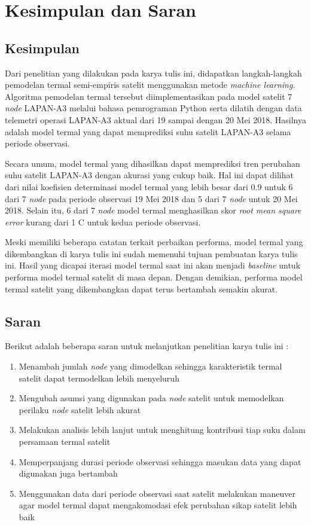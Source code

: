 \chapter{Kesimpulan dan Saran}

\section{Kesimpulan}

Dari penelitian yang dilakukan pada karya tulis ini, didapatkan langkah-langkah
pemodelan termal semi-empiris satelit menggunakan metode \textit{machine learning}.
Algoritma pemodelan termal tersebut diimplementasikan pada model satelit 7 \textit{node}
LAPAN-A3 melalui bahasa pemrograman Python serta dilatih dengan data telemetri
operasi LAPAN-A3 aktual dari 19 sampai dengan 20 Mei 2018. Hasilnya adalah model
termal yang dapat memprediksi suhu satelit LAPAN-A3 selama periode
observasi.

Secara umum, model termal yang dihasilkan dapat memprediksi tren perubahan suhu satelit LAPAN-A3 dengan akurasi yang cukup baik. Hal ini dapat
dilihat dari nilai koefisien determinasi model termal yang lebih besar dari 0.9
untuk 6 dari 7 \textit{node} pada periode observasi 19 Mei 2018 dan 5 dari 7 \textit{node} untuk
20 Mei 2018. Selain itu, 6 dari 7 \textit{node} model termal menghasilkan skor
\textit{root mean square error} kurang dari 1 \degree C untuk kedua periode observasi. 

Meski memiliki beberapa catatan terkait perbaikan performa, model termal yang
dikembangkan di karya tulis ini sudah memenuhi tujuan pembuatan karya tulis
ini. Hasil yang dicapai iterasi model termal saat ini akan menjadi
\textit{baseline} untuk performa model termal satelit di masa depan. Dengan
demikian, performa model termal satelit yang dikembangkan dapat terus bertambah
semakin akurat.

\section{Saran}

Berikut adalah beberapa saran untuk melanjutkan penelitian karya tulis ini :

\begin{enumerate}
\item Menambah jumlah \textit{node} yang dimodelkan sehingga karakteristik termal satelit dapat termodelkan lebih menyeluruh
\item Mengubah asumsi yang digunakan pada \textit{node} satelit untuk memodelkan perilaku \textit{node} satelit lebih akurat
\item Melakukan analisis lebih lanjut untuk menghitung kontribusi tiap suku dalam persamaan termal satelit
\item Memperpanjang durasi periode observasi sehingga masukan data yang dapat digunakan juga bertambah
\item Menggunakan data dari periode observasi saat satelit melakukan maneuver agar model termal dapat mengakomodasi efek perubahan sikap satelit lebih baik
\end{enumerate}
